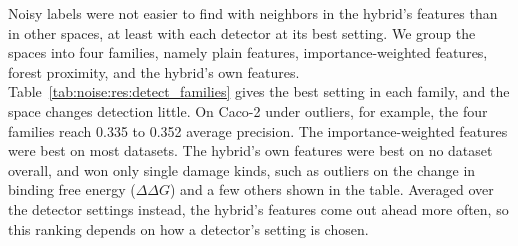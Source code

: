 Noisy labels were not easier to find with neighbors in the hybrid's features than in other spaces, at least with each detector at its best setting. We group the spaces into four families, namely plain features, importance-weighted features, forest proximity, and the hybrid's own features. Table~\ref{tab:noise:res:detect_families} gives the best setting in each family, and the space changes detection little. On Caco-2 under outliers, for example, the four families reach 0.335 to 0.352 average precision. The importance-weighted features were best on most datasets. The hybrid's own features were best on no dataset overall, and won only single damage kinds, such as outliers on the change in binding free energy ($\Delta\Delta G$) and a few others shown in the table. Averaged over the detector settings instead, the hybrid's features come out ahead more often, so this ranking depends on how a detector's setting is chosen.

